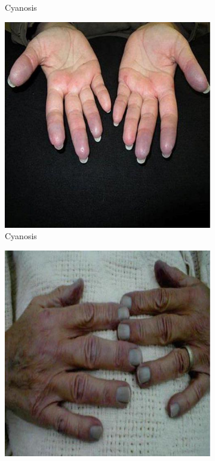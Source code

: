 \documentclass[a4paper,12pt,openany,twoside]{book}
\begin{document}
{\begin{figure}[h]
\begin{subfigure}[t]{.23\textwidth}
																	\caption{Cyanosis}
																	\label{cyanosis2}
																\end{subfigure}
																\hspace{\fill}
																\begin{subfigure}[t]{.23\textwidth}
																	\centering
																	\includegraphics[width=\textwidth]{./clinicalPhysioPic/cyanosis4-2.jpg}
																	\caption{Cyanosis}
																	\label{Cyanosis3}
																\end{subfigure}
																\hspace{\fill}
																\begin{subfigure}[t]{.23\textwidth}
																	\centering
																	\includegraphics[width=\textwidth]{./clinicalPhysioPic/cyanosis4-3.jpg}

\end{subfigure}
\end{figure}}
\end{document}
